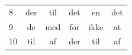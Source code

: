 \begin{table}[H]
\begin{tabular}{lccccc}
		8  & der                             & til                                                             & det                                                             & en                                                          & det                                                             \\
		9  & de                              & med                                                             & for                                                             & ikke                                                        & at                                                              \\
		10 & til                             & af                                                              & der                                                             & til                                                         & af                                                              \\ \hline
	\end{tabular}
	\label{sprogetdk}
\end{table}

